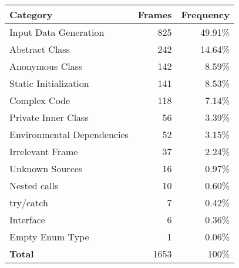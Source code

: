 \begin{tabular}{l r r} 
\textbf{Category} & \textbf{Frames} & \textbf{Frequency}  
\\\hline 
Input Data Generation & 825 & 49.91\%\\ 
Abstract Class & 242 & 14.64\%\\ 
Anonymous Class & 142 & 8.59\%\\ 
Static Initialization & 141 & 8.53\%\\ 
Complex Code & 118 & 7.14\%\\ 
Private Inner Class & 56 & 3.39\%\\ 
Environmental Dependencies & 52 & 3.15\%\\ 
Irrelevant Frame & 37 & 2.24\%\\ 
Unknown Sources& 16 & 0.97\%\\ 
Nested calls & 10 & 0.60\%\\ 
try/catch & 7 & 0.42\%\\ 
Interface & 6 & 0.36\%\\ 
Empty Enum Type & 1 & 0.06\%\\ 
\hline 
\textbf{Total} & 1653 & 100\% \\ 
\end{tabular}